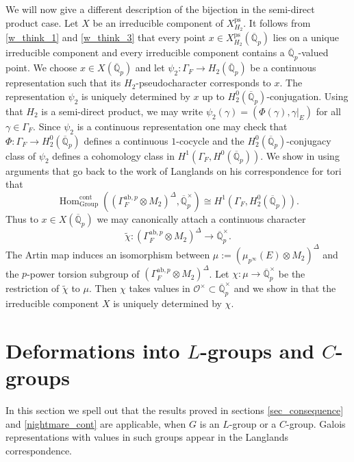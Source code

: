 \documentclass{amsart}
\theoremstyle{definition}
\theoremstyle{remark}
\DeclareMathOperator{\Hom}{Hom}
\newcommand{\Qpbar}{\overline{\mathbb{Q}}_p}
\newcommand{\ab}{\mathrm{ab}}
\newcommand{\OO}{\mathcal O}
\newcommand{\cont}{\mathrm{cont}}
\newcommand{\ps}{\mathrm{ps}}
\begin{document}
We will now give a different description of the bijection in the 
semi-direct product case. Let $X$ be an irreducible component of $X^{\ps}_{H_2}$. 
It follows from \eqref{w_think_1} and \eqref{w_think_3} that every 
point $x\in X^{\ps}_{H_2}(\Qpbar)$ lies on a unique irreducible component 
and every irreducible component contains a $\Qpbar$-valued point. 
We choose $x\in X(\Qpbar)$ and let $\psi_2: \Gamma_F \rightarrow H_2(\Qpbar)$ 
be a continuous representation such that its $H_2$-pseudocharacter corresponds to $x$. The representation $\psi_2$ is uniquely determined by $x$ up to $H_2^0(\Qpbar)$-conjugation. Using that $H_2$ is a semi-direct product, we 
may write $\psi_2(\gamma)=(\Phi(\gamma), \gamma|_E)$ for all 
$\gamma\in \Gamma_F$. Since $\psi_2$ is a continuous representation 
one may check that $\Phi: \Gamma_F \rightarrow H_2^0(\Qpbar)$ defines 
a continuous $1$-cocycle and the $H_2^0(\Qpbar)$-conjugacy class 
of $\psi_2$ defines a cohomology class in $H^1(\Gamma_F, H^0(\Qpbar))$. 
We show in \cite{defT} using arguments that go back to the work of Langlands 
\cite{langlands_tori} on his correspondence for tori that 
$$\Hom^{\cont}_{\mathrm{Group}}((\Gamma_F^{\ab,p}\otimes M_2)^{\Delta}, \Qpbar^{\times})\cong H^1(\Gamma_F, H^0_2(\Qpbar)).$$
Thus to $x\in X(\Qpbar)$ we may canonically attach a continuous character 
$$\tilde{\chi}: (\Gamma_F^{\ab,p}\otimes M_2)^{\Delta} \rightarrow \Qpbar^{\times}.$$
The Artin map induces an isomorphism between $\mu:=(\mu_{p^{\infty}}(E)\otimes M_2)^{\Delta}$ and the $p$-power torsion subgroup of $(\Gamma_F^{\ab,p}\otimes M_2)^{\Delta}$. 
Let $\chi: \mu\rightarrow  \Qpbar^{\times}$ be the  restriction  of $\tilde{\chi}$ to $\mu$. Then $\chi$ takes values in $\OO^{\times}\subset \Qpbar^{\times}$
and we show in \cite[Section 7.4]{defT} that the irreducible component $X$ is uniquely determined by $\chi$.  

\section{\texorpdfstring{Deformations into $L$-groups and $C$-groups}{Deformations into L-groups and C-groups}}\label{LandC}
In this section we  spell out that the results proved in sections \ref{sec_consequence} and \ref{nightmare_cont} are applicable, when $G$ is 
an $L$-group or a $C$-group. Galois representations with values in 
such groups appear in the Langlands correspondence. 
\end{document}
